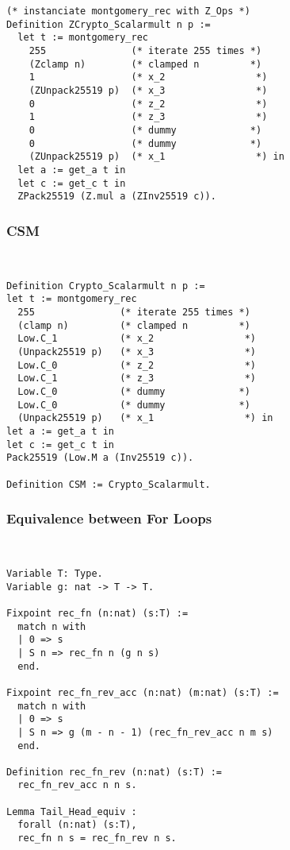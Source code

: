 \begin{lstlisting}[language=Coq]
(* instanciate montgomery_rec with Z_Ops *)
Definition ZCrypto_Scalarmult n p :=
  let t := montgomery_rec
    255               (* iterate 255 times *)
    (Zclamp n)        (* clamped n         *)
    1                 (* x_2                *)
    (ZUnpack25519 p)  (* x_3                *)
    0                 (* z_2                *)
    1                 (* z_3                *)
    0                 (* dummy             *)
    0                 (* dummy             *)
    (ZUnpack25519 p)  (* x_1                *) in
  let a := get_a t in
  let c := get_c t in
  ZPack25519 (Z.mul a (ZInv25519 c)).
\end{lstlisting}

\subsubsection{CSM}
\label{subsubsec:CryptoScalarmult}
~
\begin{lstlisting}[language=Coq]
Definition Crypto_Scalarmult n p :=
let t := montgomery_rec
  255               (* iterate 255 times *)
  (clamp n)         (* clamped n         *)
  Low.C_1           (* x_2                *)
  (Unpack25519 p)   (* x_3                *)
  Low.C_0           (* z_2                *)
  Low.C_1           (* z_3                *)
  Low.C_0           (* dummy             *)
  Low.C_0           (* dummy             *)
  (Unpack25519 p)   (* x_1                *) in
let a := get_a t in
let c := get_c t in
Pack25519 (Low.M a (Inv25519 c)).

Definition CSM := Crypto_Scalarmult.
\end{lstlisting}

\subsubsection{Equivalence between For Loops}
\label{subsubsec:for}
~
\begin{lstlisting}[language=Coq]
Variable T: Type.
Variable g: nat -> T -> T.

Fixpoint rec_fn (n:nat) (s:T) :=
  match n with
  | 0 => s
  | S n => rec_fn n (g n s)
  end.

Fixpoint rec_fn_rev_acc (n:nat) (m:nat) (s:T) :=
  match n with
  | 0 => s
  | S n => g (m - n - 1) (rec_fn_rev_acc n m s)
  end.

Definition rec_fn_rev (n:nat) (s:T) :=
  rec_fn_rev_acc n n s.

Lemma Tail_Head_equiv :
  forall (n:nat) (s:T),
  rec_fn n s = rec_fn_rev n s.
\end{lstlisting}
